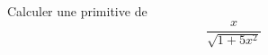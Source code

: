 Calculer une primitive de
\begin{displaymath}
 \frac{x}{\sqrt{1+5x^2}}
\end{displaymath}
\bigskip \bigskip \bigskip